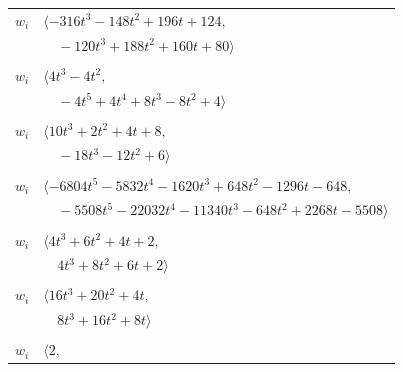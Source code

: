 \documentclass[11pt]{article}
\begin{document}
\begin{longtable}{@{}ll@{}}
$w_i$ & $\langle -316t^{3}-148t^{2}+196t+124,$\\
 & $\quad -120t^{3}+188t^{2}+160t+80\rangle$\\
\addlinespace[2pt]
\multicolumn{2}{@{}p{0.97\textwidth}@{}}{$i=24$, $D_i=4$, $\rho_{ij}$: $5{:}2, \allowbreak 11{:}1, \allowbreak 18{:}2, \allowbreak 28{:}1, \allowbreak 31{:}2$}\\
$w_i$ & $\langle 4t^{3}-4t^{2},$\\
 & $\quad -4t^{5}+4t^{4}+8t^{3}-8t^{2}+4\rangle$\\
\addlinespace[2pt]
\multicolumn{2}{@{}p{0.97\textwidth}@{}}{$i=25$, $D_i=4$, $\rho_{ij}$: $3{:}1, \allowbreak 5{:}2, \allowbreak 7{:}2, \allowbreak 12{:}1, \allowbreak 13{:}2, \allowbreak 16{:}2, \allowbreak 30{:}2$}\\
$w_i$ & $\langle 10t^{3}+2t^{2}+4t+8,$\\
 & $\quad -18t^{3}-12t^{2}+6\rangle$\\
\addlinespace[2pt]
\multicolumn{2}{@{}p{0.97\textwidth}@{}}{$i=26$, $D_i=324$, $\rho_{ij}$: $0{:}2, \allowbreak 2{:}2, \allowbreak 12{:}1, \allowbreak 13{:}1, \allowbreak 14{:}2, \allowbreak 16{:}2, \allowbreak 18{:}2, \allowbreak 21{:}1, \allowbreak 23{:}1, \allowbreak 28{:}1, \allowbreak 30{:}1, \allowbreak 31{:}2$}\\
$w_i$ & $\langle -6804t^{5}-5832t^{4}-1620t^{3}+648t^{2}-1296t-648,$\\
 & $\quad -5508t^{5}-22032t^{4}-11340t^{3}-648t^{2}+2268t-5508\rangle$\\
\addlinespace[2pt]
\multicolumn{2}{@{}p{0.97\textwidth}@{}}{$i=27$, $D_i=1$, $\rho_{ij}$: $6{:}1, \allowbreak 10{:}2, \allowbreak 11{:}2, \allowbreak 15{:}2, \allowbreak 16{:}1, \allowbreak 28{:}1$}\\
$w_i$ & $\langle 4t^{3}+6t^{2}+4t+2,$\\
 & $\quad 4t^{3}+8t^{2}+6t+2\rangle$\\
\addlinespace[2pt]
\multicolumn{2}{@{}p{0.97\textwidth}@{}}{$i=28$, $D_i=2$, $\rho_{ij}$: $16{:}1, \allowbreak 22{:}1, \allowbreak 23{:}1, \allowbreak 24{:}2, \allowbreak 26{:}2, \allowbreak 27{:}2$}\\
$w_i$ & $\langle 16t^{3}+20t^{2}+4t,$\\
 & $\quad 8t^{3}+16t^{2}+8t\rangle$\\
\addlinespace[2pt]
\multicolumn{2}{@{}p{0.97\textwidth}@{}}{$i=29$, $D_i=2$, $\rho_{ij}$: $2{:}1, \allowbreak 4{:}1, \allowbreak 7{:}2, \allowbreak 8{:}2, \allowbreak 16{:}1$}\\
$w_i$ & $\langle 2,$\\

\end{longtable}
\end{document}
